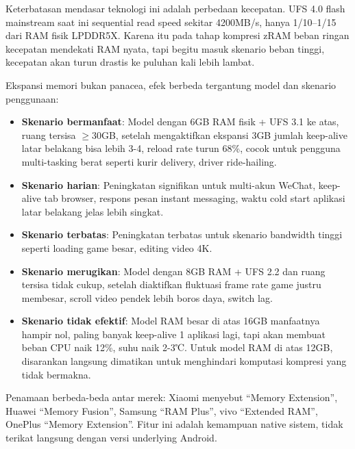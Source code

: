 
Keterbatasan mendasar teknologi ini adalah perbedaan kecepatan. UFS 4.0 flash mainstream saat ini sequential read speed sekitar 4200MB/s, hanya 1/10–1/15 dari RAM fisik LPDDR5X. Karena itu pada tahap kompresi zRAM beban ringan kecepatan mendekati RAM nyata, tapi begitu masuk skenario beban tinggi, kecepatan akan turun drastis ke puluhan kali lebih lambat.


Ekspansi memori bukan panacea, efek berbeda tergantung model dan skenario penggunaan:

\begin{itemize}
  \item \textbf{Skenario bermanfaat}: Model dengan 6GB RAM fisik + UFS 3.1 ke atas, ruang tersisa $\geq$30GB, setelah mengaktifkan ekspansi 3GB jumlah keep-alive latar belakang bisa lebih 3-4, reload rate turun 68\%, cocok untuk pengguna multi-tasking berat seperti kurir delivery, driver ride-hailing.
  \item \textbf{Skenario harian}: Peningkatan signifikan untuk multi-akun WeChat, keep-alive tab browser, respons pesan instant messaging, waktu cold start aplikasi latar belakang jelas lebih singkat.
  \item \textbf{Skenario terbatas}: Peningkatan terbatas untuk skenario bandwidth tinggi seperti loading game besar, editing video 4K.
  \item \textbf{Skenario merugikan}: Model dengan 8GB RAM + UFS 2.2 dan ruang tersisa tidak cukup, setelah diaktifkan fluktuasi frame rate game justru membesar, scroll video pendek lebih boros daya, switch lag.
  \item \textbf{Skenario tidak efektif}: Model RAM besar di atas 16GB manfaatnya hampir nol, paling banyak keep-alive 1 aplikasi lagi, tapi akan membuat beban CPU naik 12\%, suhu naik 2-3℃. Untuk model RAM di atas 12GB, disarankan langsung dimatikan untuk menghindari komputasi kompresi yang tidak bermakna.
\end{itemize}


Penamaan berbeda-beda antar merek: Xiaomi menyebut “Memory Extension”, Huawei “Memory Fusion”, Samsung “RAM Plus”, vivo “Extended RAM”, OnePlus “Memory Extension”. Fitur ini adalah kemampuan native sistem, tidak terikat langsung dengan versi underlying Android.


